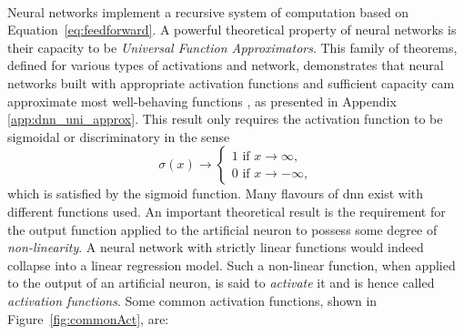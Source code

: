 \paragraph{}Neural networks implement a recursive system of computation based on Equation~\ref{eq:feedforward}. A powerful theoretical property of neural networks is their capacity to be \textit{Universal Function Approximators}. This family of theorems, defined for various types of activations and network, demonstrates that neural networks built with appropriate activation functions and sufficient capacity cam approximate most well-behaving functions \cite{universalFuncApproxNN,HORNIK1989359, universApproximator-Relu}, as presented in Appendix \ref{app:dnn_uni_approx}. This result only requires the activation function to be sigmoidal or discriminatory in the sense
\begin{equation}
    \sigma(x) \rightarrow
    \begin{cases}
        1 \text{ if } x \rightarrow \infty,  \\
        0 \text{ if } x \rightarrow -\infty,
    \end{cases}
\end{equation}
which is satisfied by the sigmoid function. Many flavours of \gls{dnn} exist with different functions used. An important theoretical result is the requirement for the output function applied to the artificial neuron to possess some degree of \textit{non-linearity}. A neural network with strictly linear functions would indeed collapse into a linear regression model. Such a non-linear function, when applied to the output of an artificial neuron, is said to \textit{activate} it and is hence called \textit{activation functions}. Some common activation functions, shown in Figure~\ref{fig:commonAct}, are:
